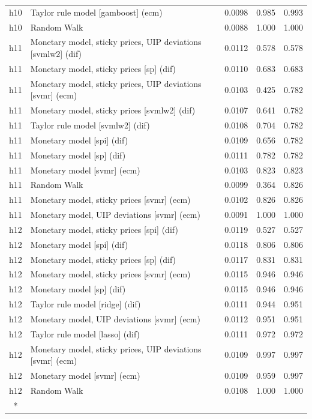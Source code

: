 \begin{ThreePartTable}
\begin{longtable}[t]{cp{5.5cm}ccc}
h10 & \raggedright Taylor rule model [gamboost] (ecm) & 0.0098 & 0.985 & 0.993\\
h10 & \raggedright Random Walk & 0.0088 & 1.000 & 1.000\\
\addlinespace
h11 & \raggedright Monetary model, sticky prices, UIP deviations [svmlw2] (dif) & 0.0112 & 0.578 & 0.578\\
h11 & \raggedright Monetary model, sticky prices [sp] (dif) & 0.0110 & 0.683 & 0.683\\
h11 & \raggedright Monetary model, sticky prices, UIP deviations [svmr] (ecm) & 0.0103 & 0.425 & 0.782\\
h11 & \raggedright Monetary model, sticky prices [svmlw2] (dif) & 0.0107 & 0.641 & 0.782\\
h11 & \raggedright Taylor rule model [svmlw2] (dif) & 0.0108 & 0.704 & 0.782\\
h11 & \raggedright Monetary model [spi] (dif) & 0.0109 & 0.656 & 0.782\\
h11 & \raggedright Monetary model [sp] (dif) & 0.0111 & 0.782 & 0.782\\
h11 & \raggedright Monetary model [svmr] (ecm) & 0.0103 & 0.823 & 0.823\\
h11 & \raggedright Random Walk & 0.0099 & 0.364 & 0.826\\
h11 & \raggedright Monetary model, sticky prices [svmr] (ecm) & 0.0102 & 0.826 & 0.826\\
h11 & \raggedright Monetary model, UIP deviations [svmr] (ecm) & 0.0091 & 1.000 & 1.000\\
\addlinespace
h12 & \raggedright Monetary model, sticky prices [spi] (dif) & 0.0119 & 0.527 & 0.527\\
h12 & \raggedright Monetary model [spi] (dif) & 0.0118 & 0.806 & 0.806\\
h12 & \raggedright Monetary model, sticky prices [sp] (dif) & 0.0117 & 0.831 & 0.831\\
h12 & \raggedright Monetary model, sticky prices [svmr] (ecm) & 0.0115 & 0.946 & 0.946\\
h12 & \raggedright Monetary model [sp] (dif) & 0.0115 & 0.946 & 0.946\\
h12 & \raggedright Taylor rule model [ridge] (dif) & 0.0111 & 0.944 & 0.951\\
h12 & \raggedright Monetary model, UIP deviations [svmr] (ecm) & 0.0112 & 0.951 & 0.951\\
h12 & \raggedright Taylor rule model [lasso] (dif) & 0.0111 & 0.972 & 0.972\\
h12 & \raggedright Monetary model, sticky prices, UIP deviations [svmr] (ecm) & 0.0109 & 0.997 & 0.997\\
h12 & \raggedright Monetary model [svmr] (ecm) & 0.0109 & 0.959 & 0.997\\
h12 & \raggedright Random Walk & 0.0108 & 1.000 & 1.000\\*
\end{longtable}
\end{ThreePartTable}
\endgroup{}
